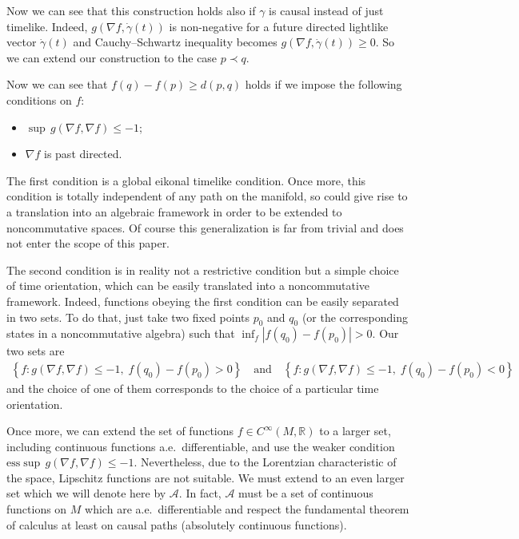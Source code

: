 \documentclass[pdftex]{sigma}
\newcommand{\abs}[1]{\left\vert {#1} \right\vert}
\newcommand{\set}[1]{\left\{ {#1} \right\}}
\newcommand{\setR}{{\mathbb R}}
\begin{document}
Now we can see that this construction holds also if $\gamma$ is causal instead of just timelike. Indeed, $g( \nabla f,\dot\gamma(t))$ is non-negative for a future directed lightlike vector $\dot\gamma(t)$ and Cauchy--Schwartz inequality becomes $g( \nabla f,\dot\gamma(t)) \geq 0$. So we can extend our construction to the case $p \prec q$.

Now we can see that $f(q) - f(p) \geq d(p,q)$ holds if we impose the following conditions on $f$:
\begin{itemize}\itemsep=0pt
\item  $\sup\, g( \nabla f, \nabla f ) \leq -1$;
\item $\nabla f$ is past directed.
\end{itemize}

The f\/irst condition is a global eikonal timelike condition. Once more, this condition is totally independent of any path on the manifold, so could give rise to a translation into an algebraic framework in order to be extended to noncommutative spaces. Of course this generalization is far from trivial and does not enter the scope of this paper.

The second condition is in reality not a restrictive condition but a simple choice of time orientation, which can be easily translated into a noncommutative framework. Indeed, functions obeying the f\/irst condition can be easily separated in two sets. To do that, just take two f\/ixed points $p_0$ and $q_0$ (or the corresponding states in a noncommutative algebra) such that $\inf_f \abs{ f(q_0) -f(p_0) } > 0$. Our two sets are
\begin{gather*}
\set{ f : g( \nabla f, \nabla f ) \leq -1,\; f(q_0) - f(p_0) > 0}\!\!\quad\text{and}\quad\!\!  \set{ f : g( \nabla f, \nabla f ) \leq -1,\; f(q_0) - f(p_0) < 0}\!
\end{gather*}
 and the choice of one of them corresponds to the choice of a particular time orientation.

Once more, we can extend the set of functions $f \in C^\infty(M,\setR)$ to a larger set, including continuous functions a.e.\ dif\/ferentiable, and use the weaker condition $\text{ess}\sup\, g( \nabla f, \nabla f ) \leq -1$. Nevertheless, due to the Lorentzian characteristic of the space, Lipschitz functions are not suitable. We must extend to an even larger set which we will denote here by $\mathcal A$. In fact, $\mathcal A$ must be a set of continuous functions on $M$ which are a.e.\ dif\/ferentiable and respect the fundamental theorem of calculus at least on causal paths (absolutely continuous functions).
\end{document}
